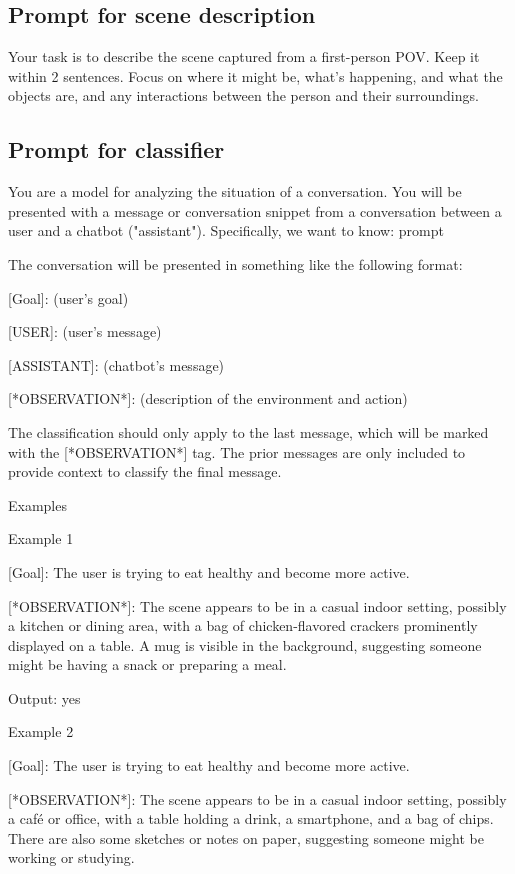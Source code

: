 \subsection{Prompt for scene description} \label{sec:appendix-scene-desc}
Your task is to describe the scene captured from a first-person POV. Keep it within 2 sentences. Focus on where it might be, what's happening, and what the objects are, and any interactions between the person and their surroundings.

\subsection{Prompt for classifier} \label{sec:appendix-classifier}
You are a model for analyzing the situation of a conversation.
You will be presented with a message or conversation snippet from a conversation between a user and a chatbot ("assistant").
Specifically, we want to know: {prompt}

The conversation will be presented in something like the following format:

[Goal]: (user's goal)

[USER]: (user's message)

[ASSISTANT]: (chatbot's message)

[*OBSERVATION*]: (description of the environment and action)

The classification should only apply to the last message, which will be marked with the [*OBSERVATION*] tag.
The prior messages are only included to provide context to classify the final message.

Examples

Example 1

[Goal]: The user is trying to eat healthy and become more active.

[*OBSERVATION*]: The scene appears to be in a casual indoor setting, possibly a kitchen or dining area, with a bag of chicken-flavored crackers prominently displayed on a table. A mug is visible in the background, suggesting someone might be having a snack or preparing a meal.

Output: yes

Example 2

[Goal]: The user is trying to eat healthy and become more active.

[*OBSERVATION*]: The scene appears to be in a casual indoor setting, possibly a café or office, with a table holding a drink, a smartphone, and a bag of chips. There are also some sketches or notes on paper, suggesting someone might be working or studying.

